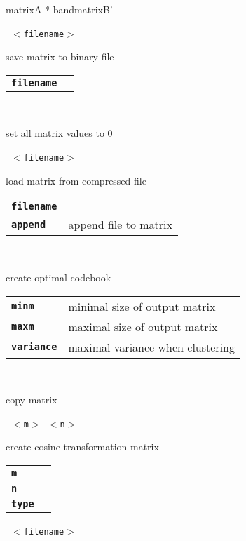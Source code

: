 \begin{description}
\begin{description}
        matrixA * bandmatrixB'

       \texttt{ $<$filename$>$} \

        save matrix to binary file

      \begin{tabular}{ll}
 \texttt{\textbf{filename}} &    \\
      \end{tabular}
       \texttt{} \

        set all matrix values to 0

       \texttt{ $<$filename$>$ } \

        load matrix from compressed file

      \begin{tabular}{ll}
 \texttt{\textbf{filename}} &    \\
 \texttt{\textbf{append}} &     append file to matrix  \\
      \end{tabular}
       \texttt{   } \

        create optimal codebook

      \begin{tabular}{ll}
 \texttt{\textbf{minm}} &      minimal size of output matrix  \\
 \texttt{\textbf{maxm}} &      maximal size of output matrix  \\
 \texttt{\textbf{variance}} &  maximal variance when clustering  \\
      \end{tabular}
       \texttt{} \

        copy matrix

       \texttt{ $<$m$>$ $<$n$>$ } \

        create cosine transformation matrix

      \begin{tabular}{ll}
 \texttt{\textbf{m}} &  \\
 \texttt{\textbf{n}} &  \\
 \texttt{\textbf{type}} &    \\
      \end{tabular}
       \texttt{ $<$filename$>$ } \


\end{description}
\end{description}
